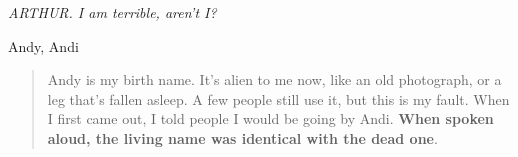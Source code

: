 \begin{center}
	\emph{ARTHUR. I \emph{am} terrible, aren’t I?}
\end{center}

Andy, Andi
\begin{quote}
	Andy is my birth name. It’s alien to me now, like an old photograph, or a leg that’s fallen asleep. A few people still use it, but this is my fault. When I first came out, I told people I would be going by Andi. \textbf{When spoken aloud, the living name was identical with the dead one}.
\end{quote}

